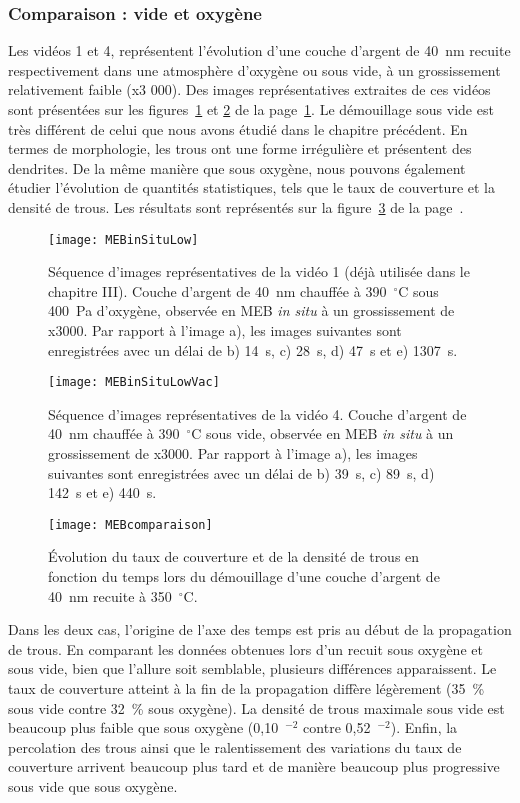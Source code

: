 		\subsubsection{Comparaison : vide et oxygène}
Les vidéos 1 et 4, représentent l’évolution d’une couche d’argent de 40~nm recuite respectivement dans une atmosphère d’oxygène ou sous vide, à un grossissement relativement faible (x3 000). Des images représentatives extraites de ces vidéos sont présentées sur les figures~\ref{MEBinSituLow} et \ref{MEBinSituLowVac} de la page~\ref{MEBinSituLow}. Le démouillage sous vide est très différent de celui que nous avons étudié dans le chapitre précédent. En termes de morphologie, les trous ont une forme irrégulière et présentent des dendrites. De la même manière que sous oxygène, nous pouvons également étudier l’évolution de quantités statistiques, tels que le taux de couverture et la densité de trous. Les résultats sont représentés sur la figure~\ref{MEBcomparaison} de la page~\pageref{MEBcomparaison}.\par 
\begin{figure}[!p]
\centering
\texttt{[image: MEBinSituLow]}
\caption{Séquence d’images représentatives de la vidéo 1 (déjà utilisée dans le chapitre III). Couche d’argent de 40~nm chauffée à 390~$^\circ$C sous 400~Pa d’oxygène, observée en MEB \textit{in situ} à un grossissement de x3000. Par rapport à l’image a), les images suivantes sont enregistrées avec un délai de b) 14~s, c) 28~s, d) 47~s et e) 1307~s.}
\label{MEBinSituLow}
\end{figure}
\begin{figure}[!p]
\centering
\texttt{[image: MEBinSituLowVac]}
\caption{Séquence d’images représentatives de la vidéo 4. Couche d’argent de 40~nm chauffée à 390~$^\circ$C sous vide, observée en MEB \textit{in situ} à un grossissement de x3000. Par rapport à l’image a), les images suivantes sont enregistrées avec un délai de b) 39~s, c) 89~s, d) 142~s et e) 440~s.}
\label{MEBinSituLowVac}
\end{figure}
\begin{figure}[!p]
\centering
\texttt{[image: MEBcomparaison]}
\caption{Évolution du taux de couverture et de la densité de trous en fonction du temps lors du démouillage d’une couche d’argent de 40~nm recuite à 350~$^\circ$C.}
\label{MEBcomparaison}
\end{figure}
Dans les deux cas, l’origine de l’axe des temps est pris au début de la propagation de trous. En comparant les données obtenues lors d’un recuit sous oxygène et sous vide, bien que l’allure soit semblable, plusieurs différences apparaissent. Le taux de couverture atteint à la fin de la propagation diffère légèrement (35~\% sous vide contre 32~\% sous oxygène). La densité de trous maximale sous vide est beaucoup plus faible que sous oxygène (0,10~\micro\meter$^{-2}$ contre 0,52~\micro\meter$^{-2}$). Enfin, la percolation des trous ainsi que le ralentissement des variations du taux de couverture arrivent beaucoup plus tard et de manière beaucoup plus progressive sous vide que sous oxygène.\par 
